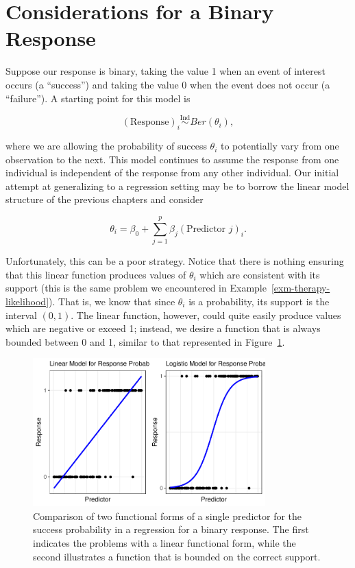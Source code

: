 \documentclass[
  letterpaper,
  DIV=11,
  numbers=noendperiod]{scrreprt}
\theoremstyle{definition}
\theoremstyle{plain}
\theoremstyle{definition}
\theoremstyle{remark}
\begin{document}
\hypertarget{considerations-for-a-binary-response}{%
\section{Considerations for a Binary
Response}\label{considerations-for-a-binary-response}}

Suppose our response is binary, taking the value 1 when an event of
interest occurs (a ``success'') and taking the value 0 when the event
does not occur (a ``failure''). A starting point for this model is

\[(\text{Response})_i \stackrel{\text{Ind}}{\sim}Ber\left(\theta_i\right),\]

where we are allowing the probability of success \(\theta_i\) to
potentially vary from one observation to the next. This model continues
to assume the response from one individual is independent of the
response from any other individual. Our initial attempt at generalizing
to a regression setting may be to borrow the linear model structure of
the previous chapters and consider

\[\theta_i = \beta_0 + \sum_{j=1}^{p} \beta_j (\text{Predictor } j)_i.\]

Unfortunately, this can be a poor strategy. Notice that there is nothing
ensuring that this linear function produces values of \(\theta_i\) which
are consistent with its support (this is the same problem we encountered
in Example~\ref{exm-therapy-likelihood}). That is, we know that since
\(\theta_i\) is a probability, its support is the interval \((0, 1)\).
The linear function, however, could quite easily produce values which
are negative or exceed 1; instead, we desire a function that is always
bounded between 0 and 1, similar to that represented in
Figure~\ref{fig-logistic-regression}.

\begin{figure}

{\centering \includegraphics[width=0.8\textwidth,height=\textheight]{./images/fig-logistic-regression-1.pdf}

}

\caption{\label{fig-logistic-regression}Comparison of two functional
forms of a single predictor for the success probability in a regression
for a binary response. The first indicates the problems with a linear
functional form, while the second illustrates a function that is bounded
on the correct support.}

\end{figure}
\end{document}
